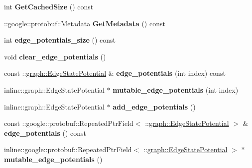 \begin{DoxyCompactItemize}
\item 
\hypertarget{classgraph_1_1MRFEdge_a2b59a32ff130f0764e937f043fd03778}{
int {\bfseries GetCachedSize} () const }
\label{classgraph_1_1MRFEdge_a2b59a32ff130f0764e937f043fd03778}

\item 
\hypertarget{classgraph_1_1MRFEdge_a3bc4a11c7f89dbff2a95e6f58b0782d9}{
::google::protobuf::Metadata {\bfseries GetMetadata} () const }
\label{classgraph_1_1MRFEdge_a3bc4a11c7f89dbff2a95e6f58b0782d9}

\item 
\hypertarget{classgraph_1_1MRFEdge_ae838e1baabe8852d5ec775f0284ba8b7}{
int {\bfseries edge\_\-potentials\_\-size} () const }
\label{classgraph_1_1MRFEdge_ae838e1baabe8852d5ec775f0284ba8b7}

\item 
\hypertarget{classgraph_1_1MRFEdge_a53d239c44edb18262f0a3c13fd88fb03}{
void {\bfseries clear\_\-edge\_\-potentials} ()}
\label{classgraph_1_1MRFEdge_a53d239c44edb18262f0a3c13fd88fb03}

\item 
\hypertarget{classgraph_1_1MRFEdge_a8dfe87119ec061fe429f4613dd23b1ad}{
const ::\hyperlink{classgraph_1_1EdgeStatePotential}{graph::EdgeStatePotential} \& {\bfseries edge\_\-potentials} (int index) const }
\label{classgraph_1_1MRFEdge_a8dfe87119ec061fe429f4613dd23b1ad}

\item 
\hypertarget{classgraph_1_1MRFEdge_aeff746d072366c703b082307e958d2f0}{
inline::graph::EdgeStatePotential $\ast$ {\bfseries mutable\_\-edge\_\-potentials} (int index)}
\label{classgraph_1_1MRFEdge_aeff746d072366c703b082307e958d2f0}

\item 
\hypertarget{classgraph_1_1MRFEdge_a41a3d93e349503b5d3e24bdc21044810}{
inline::graph::EdgeStatePotential $\ast$ {\bfseries add\_\-edge\_\-potentials} ()}
\label{classgraph_1_1MRFEdge_a41a3d93e349503b5d3e24bdc21044810}

\item 
\hypertarget{classgraph_1_1MRFEdge_a9429ca0ab408685e9d2a955366f50ed6}{
const ::google::protobuf::RepeatedPtrField$<$ ::\hyperlink{classgraph_1_1EdgeStatePotential}{graph::EdgeStatePotential} $>$ \& {\bfseries edge\_\-potentials} () const }
\label{classgraph_1_1MRFEdge_a9429ca0ab408685e9d2a955366f50ed6}

\item 
\hypertarget{classgraph_1_1MRFEdge_a5f8f28def741a8d3476c36eeab872547}{
inline::google::protobuf::RepeatedPtrField$<$ ::\hyperlink{classgraph_1_1EdgeStatePotential}{graph::EdgeStatePotential} $>$ $\ast$ {\bfseries mutable\_\-edge\_\-potentials} ()}
\label{classgraph_1_1MRFEdge_a5f8f28def741a8d3476c36eeab872547}


\end{DoxyCompactItemize}
